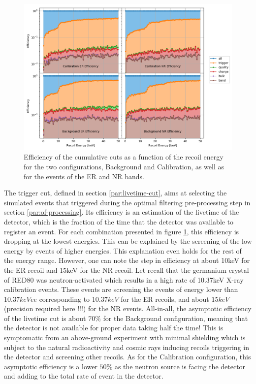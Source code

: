 \begin{figure}
\centering
\includegraphics[width=\linewidth,]{Figures/Neutron/cut_efficiency.png}
\caption{Efficiency of the cumulative cuts as a function of the recoil energy for the two configurations, Background and Calibration, as well as for the events of the ER and NR bands.}
\label{fig:cut-efficiency}
\end{figure}

The trigger cut, defined in section \ref{par:livetime-cut}, aims at selecting the simulated events that triggered during the optimal filtering pre-processing step in section \ref{par:of-processing}. Its efficiency is an estimation of the livetime of the detector, which is the fraction of the time that the detector was available to register an event. For each combination presented in figure \ref{fig:cut-efficiency}, this efficiency is dropping at the lowest energies. This can be explained by the screening of the low energy by events of higher energies. This explanation even holds for the rest of the energy range. However, one can note the step in efficiency at about 10keV for the ER recoil and 15keV for the NR recoil. Let recall that the germanium crystal of RED80 was neutron-activated which results in a high rate of 10.37keV X-ray calibration events. These events are screening the events of energy lower than $10.37keVee$ corresponding to $10.37keV$ for the ER recoils, and about $15keV$ (precision required here !!!) for the NR events. All-in-all, the asymptotic efficiency of the livetime cut is about $70\%$ for the Background configuration, meaning that the detector is not available for proper data taking half the time! This is symptomatic from an above-ground experiment with minimal shielding which is subject to the natural radioactivity and cosmic rays inducing recoils triggering in the detector and screening other recoils. As for the Calibration configuration, this asymptotic efficiency is a lower $50\%$ as the neutron source is facing the detector and adding to the total rate of event in the detector.

